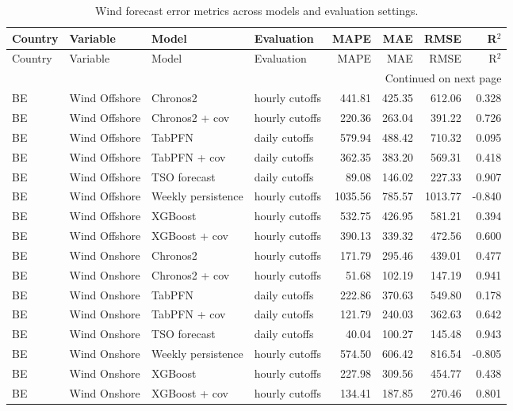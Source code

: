\begin{longtable}{llllrrrr}
\caption{Wind forecast error metrics across models and evaluation settings.}\label{tab:wind_forecast_error_metrics}\\
\toprule
Country & Variable & Model & Evaluation & MAPE & MAE & RMSE & R$^2$ \\
\midrule
\endfirsthead
\toprule
Country & Variable & Model & Evaluation & MAPE & MAE & RMSE & R$^2$ \\
\midrule
\endhead
\midrule
\multicolumn{8}{r}{Continued on next page} \\
\midrule
\endfoot
\bottomrule
\endlastfoot
BE & Wind Offshore & Chronos2 & hourly cutoffs & 441.81 & 425.35 & 612.06 & 0.328 \\
BE & Wind Offshore & Chronos2 + cov & hourly cutoffs & 220.36 & 263.04 & 391.22 & 0.726 \\
BE & Wind Offshore & TabPFN & daily cutoffs & 579.94 & 488.42 & 710.32 & 0.095 \\
BE & Wind Offshore & TabPFN + cov & daily cutoffs & 362.35 & 383.20 & 569.31 & 0.418 \\
BE & Wind Offshore & TSO forecast & daily cutoffs & 89.08 & 146.02 & 227.33 & 0.907 \\
BE & Wind Offshore & Weekly persistence & hourly cutoffs & 1035.56 & 785.57 & 1013.77 & -0.840 \\
BE & Wind Offshore & XGBoost & hourly cutoffs & 532.75 & 426.95 & 581.21 & 0.394 \\
BE & Wind Offshore & XGBoost + cov & hourly cutoffs & 390.13 & 339.32 & 472.56 & 0.600 \\
BE & Wind Onshore & Chronos2 & hourly cutoffs & 171.79 & 295.46 & 439.01 & 0.477 \\
BE & Wind Onshore & Chronos2 + cov & hourly cutoffs & 51.68 & 102.19 & 147.19 & 0.941 \\
BE & Wind Onshore & TabPFN & daily cutoffs & 222.86 & 370.63 & 549.80 & 0.178 \\
BE & Wind Onshore & TabPFN + cov & daily cutoffs & 121.79 & 240.03 & 362.63 & 0.642 \\
BE & Wind Onshore & TSO forecast & daily cutoffs & 40.04 & 100.27 & 145.48 & 0.943 \\
BE & Wind Onshore & Weekly persistence & hourly cutoffs & 574.50 & 606.42 & 816.54 & -0.805 \\
BE & Wind Onshore & XGBoost & hourly cutoffs & 227.98 & 309.56 & 454.77 & 0.438 \\
BE & Wind Onshore & XGBoost + cov & hourly cutoffs & 134.41 & 187.85 & 270.46 & 0.801 \\

\end{longtable}
